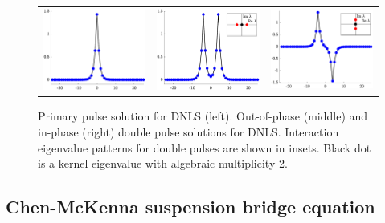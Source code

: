\documentclass[12pt,reqno,oneside]{article}
\begin{document}
\begin{figure}
    \centering
    \begin{tabular}{ccc}
        \includegraphics[width=5cm]{images/DNLSprimary.eps} &
        \includegraphics[width=5cm]{images/DNLSunstable2p.eps} &
        \includegraphics[width=5cm]{images/DNLSstable2p.eps} 
    \end{tabular}
    \caption{Primary pulse solution for DNLS (left). Out-of-phase (middle) and in-phase (right) double pulse solutions for DNLS. Interaction eigenvalue patterns for double pulses are shown in insets. Black dot is a kernel eigenvalue with algebraic multiplicity 2.}
    \label{fig:DNLS2p}
\end{figure}


\subsection*{Chen-McKenna suspension bridge equation}
\end{document}
